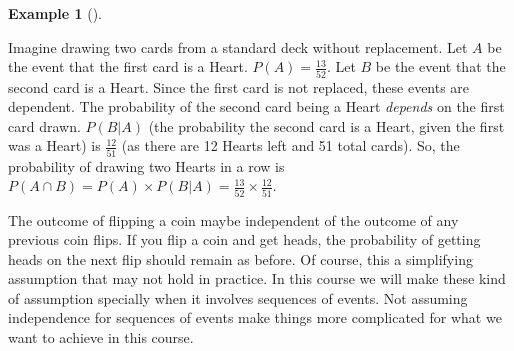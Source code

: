 \documentclass[
  letterpaper,
  DIV=11,
  numbers=noendperiod]{scrreport}
\theoremstyle{definition}
\newtheorem{example}{Example}[chapter]
\theoremstyle{plain}
\theoremstyle{definition}
\theoremstyle{plain}
\theoremstyle{remark}
\begin{document}
\begin{tcolorbox}[enhanced jigsaw, breakable, opacityback=0, leftrule=.75mm, colback=white, bottomtitle=1mm, coltitle=black, toptitle=1mm, titlerule=0mm, bottomrule=.15mm, colframe=quarto-callout-note-color-frame, title={Drawing Cards without Replacement}, opacitybacktitle=0.6, colbacktitle=quarto-callout-note-color!10!white, rightrule=.15mm, arc=.35mm, toprule=.15mm, left=2mm]

\begin{example}[]\protect\hypertarget{exm-drawing-cards-dependence}{}\label{exm-drawing-cards-dependence}

Imagine drawing two cards from a standard deck without replacement. Let
\(A\) be the event that the first card is a Heart.
\(P(A) = \frac{13}{52}\). Let \(B\) be the event that the second card is
a Heart. Since the first card is not replaced, these events are
dependent. The probability of the second card being a Heart
\emph{depends} on the first card drawn. \(P(B|A)\) (the probability the
second card is a Heart, given the first was a Heart) is
\(\frac{12}{51}\) (as there are 12 Hearts left and 51 total cards). So,
the probability of drawing two Hearts in a row is
\(P(A \cap B) = P(A) \times P(B|A) = \frac{13}{52} \times \frac{12}{51}\).

\end{example}

\end{tcolorbox}

\begin{tcolorbox}[enhanced jigsaw, breakable, opacityback=0, leftrule=.75mm, colback=white, bottomtitle=1mm, coltitle=black, toptitle=1mm, titlerule=0mm, bottomrule=.15mm, colframe=quarto-callout-note-color-frame, title=\textcolor{quarto-callout-note-color}{\faInfo}\hspace{0.5em}{Note}, opacitybacktitle=0.6, colbacktitle=quarto-callout-note-color!10!white, rightrule=.15mm, arc=.35mm, toprule=.15mm, left=2mm]

The outcome of flipping a coin maybe independent of the outcome of any
previous coin flips. If you flip a coin and get heads, the probability
of getting heads on the next flip should remain as before. Of course,
this a simplifying assumption that may not hold in practice. In this
course we will make these kind of assumption specially when it involves
sequences of events. Not assuming independence for sequences of events
make things more complicated for what we want to achieve in this course.

\end{tcolorbox}
\end{document}
